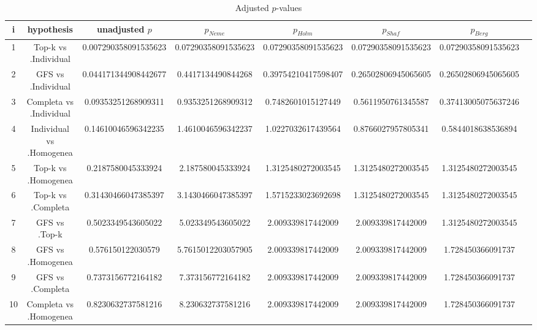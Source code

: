 \documentclass[a4paper,10pt]{article}
\begin{document}
\begin{landscape}
\begin{table}[!htp]
\centering\tiny
\caption{Adjusted $p$-values}
\begin{tabular}{cccccccc}
i&hypothesis&unadjusted $p$&$p_{Neme}$&$p_{Holm}$&$p_{Shaf}$&$p_{Berg}$\\
\hline
1&Top-k vs .Individual&0.007290358091535623&0.07290358091535623&0.07290358091535623&0.07290358091535623&0.07290358091535623\\
2&GFS vs .Individual&0.044171344908442677&0.4417134490844268&0.39754210417598407&0.26502806945065605&0.26502806945065605\\
3&Completa vs .Individual&0.09353251268909311&0.9353251268909312&0.7482601015127449&0.5611950761345587&0.37413005075637246\\
4&Individual vs .Homogenea&0.14610046596342235&1.4610046596342237&1.0227032617439564&0.8766027957805341&0.5844018638536894\\
5&Top-k vs .Homogenea&0.2187580045333924&2.187580045333924&1.3125480272003545&1.3125480272003545&1.3125480272003545\\
6&Top-k vs .Completa&0.31430466047385397&3.1430466047385397&1.5715233023692698&1.3125480272003545&1.3125480272003545\\
7&GFS vs .Top-k&0.5023349543605022&5.023349543605022&2.009339817442009&2.009339817442009&1.3125480272003545\\
8&GFS vs .Homogenea&0.576150122030579&5.7615012203057905&2.009339817442009&2.009339817442009&1.728450366091737\\
9&GFS vs .Completa&0.7373156772164182&7.373156772164182&2.009339817442009&2.009339817442009&1.728450366091737\\
10&Completa vs .Homogenea&0.8230632737581216&8.230632737581216&2.009339817442009&2.009339817442009&1.728450366091737\\
\hline
\end{tabular}
\end{table}

\end{landscape}
\end{document}
